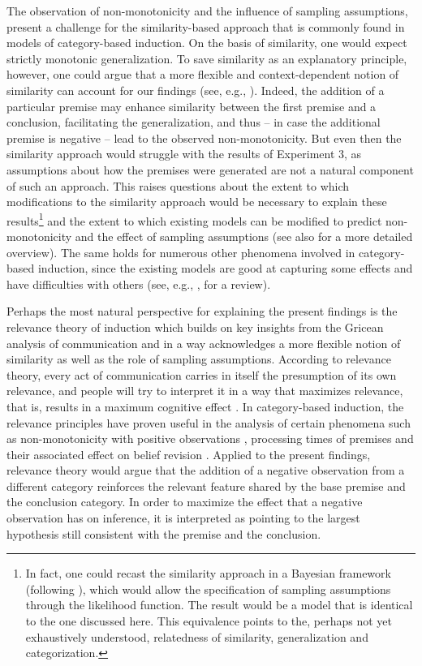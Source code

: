 \documentclass[authoryear,11pt]{elsarticle}
\begin{document}
The observation of non-monotonicity and the influence of sampling assumptions, present a challenge for the similarity-based approach that is commonly found in models of category-based induction. On the basis of similarity, one would expect strictly monotonic generalization. To save similarity as an explanatory principle, however, one could argue that a more flexible and context-dependent notion of similarity can account for our findings (see, e.g., \citealt{Medinetal1993}). Indeed, the addition of a particular premise may enhance similarity between the first premise and a conclusion, facilitating the generalization, and thus -- in case the additional premise is negative -- lead to the observed non-monotonicity. But even then the similarity approach would struggle with the results of Experiment 3, as assumptions about how the premises were generated are not a natural component of such an approach. This raises questions about the extent to which modifications to the similarity approach would be necessary to explain these results\footnote{In fact, one could recast the similarity approach in a Bayesian framework (following \citealt{TenenbaumGriffiths2001}), which would allow the specification of sampling assumptions through the likelihood function. The result would be a model that is identical to the one discussed here. This equivalence points to the, perhaps not yet exhaustively understood, relatedness of similarity, generalization and categorization.} and the extent to which existing models can be modified to predict non-monotonicity and the effect of sampling assumptions (see also \citealt{Heussenetal2011} for a more detailed overview). The same holds for numerous other phenomena involved in category-based induction, since the existing models are good at capturing some effects and have difficulties with others (see, e.g., \citealt{Hayesetal2010}, for a review).

Perhaps the most natural perspective for explaining the present findings is the relevance theory of induction \citep{Medinetal2003} which builds on key insights from the Gricean analysis of communication and in a way acknowledges a more flexible notion of similarity as well as the role of sampling assumptions. According to relevance theory, every act of communication carries in itself the presumption of its own relevance, and people will try to interpret it in a way that maximizes relevance, that is, results in a maximum cognitive effect \citep[e.g.][]{Vanderhenstetal2002}. In category-based induction, the relevance principles have proven useful in the analysis of certain phenomena such as non-monotonicity with positive observations \citep{Medinetal2003}, processing times of premises and their associated effect on belief revision \cite{Feeneyetal2010}. Applied to the present findings, relevance theory would argue that the addition of a negative observation from a different category reinforces the relevant feature shared by the base premise and the conclusion category. In order to maximize the effect that a negative observation has on inference, it is interpreted as pointing to the largest hypothesis still consistent with the premise and the conclusion.
\end{document}
